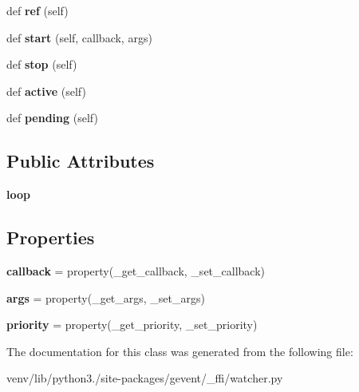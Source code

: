 \begin{DoxyCompactItemize}
def {\bfseries ref} (self)
\item 
\mbox{\label{classgevent_1_1__ffi_1_1watcher_1_1watcher_ae0b0b69068965a61a57e22503c592dfd}} 
def {\bfseries start} (self, callback, args)
\item 
\mbox{\label{classgevent_1_1__ffi_1_1watcher_1_1watcher_ae3bc13546a787416097b307c9345abc2}} 
def {\bfseries stop} (self)
\item 
\mbox{\label{classgevent_1_1__ffi_1_1watcher_1_1watcher_aa06d8c98dbc545b53cf03822a44c89ef}} 
def {\bfseries active} (self)
\item 
\mbox{\label{classgevent_1_1__ffi_1_1watcher_1_1watcher_abd1830a9c9a440bef0befa945be73cbf}} 
def {\bfseries pending} (self)
\end{DoxyCompactItemize}
\subsection*{Public Attributes}
\begin{DoxyCompactItemize}
\item 
\mbox{\label{classgevent_1_1__ffi_1_1watcher_1_1watcher_a0275306641ff4a429bf3cd22ec2eda38}} 
{\bfseries loop}
\end{DoxyCompactItemize}
\subsection*{Properties}
\begin{DoxyCompactItemize}
\item 
\mbox{\label{classgevent_1_1__ffi_1_1watcher_1_1watcher_ae94e7593a8d0bb92c690b2d80bae9e12}} 
{\bfseries callback} = property(\+\_\+get\+\_\+callback, \+\_\+set\+\_\+callback)
\item 
\mbox{\label{classgevent_1_1__ffi_1_1watcher_1_1watcher_a0d649ba44b6eabb9593e342219a3f6fd}} 
{\bfseries args} = property(\+\_\+get\+\_\+args, \+\_\+set\+\_\+args)
\item 
\mbox{\label{classgevent_1_1__ffi_1_1watcher_1_1watcher_a413d722016bb565a8a49609f393a79e7}} 
{\bfseries priority} = property(\+\_\+get\+\_\+priority, \+\_\+set\+\_\+priority)
\end{DoxyCompactItemize}


The documentation for this class was generated from the following file\+:\begin{DoxyCompactItemize}
\item 
venv/lib/python3./site-\/packages/gevent/\+\_\+ffi/watcher.\+py\end{DoxyCompactItemize}
